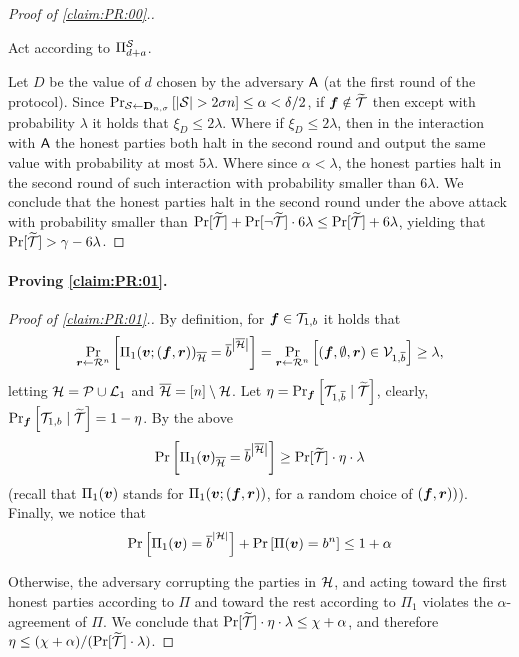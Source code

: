 \begin{proof}[Proof of \cref{claim:PR:00}.]
{\begin{algorithm}[$\Ac$]
\begin{description}
		\quad Act according to $\Pi^{{\cal{S}}}_{d+a}$.
			
	
\end{description}			
	\end{algorithm}
}

Let $D$ be the value of $d$ chosen by the adversary $\Ac$ (at the first round of the protocol).
Since $\Pr_{{\cal{S}} \gets \mathbf{D}_{n,\sigma}}\left[ \left|{\cal{S}}\right| > 2\sigma n\right] \le \alpha < \delta/2$,
if ${ \boldsymbol{f}} \notin {\widetilde{\mathcal{T}}}$ then except with probability $\lambda$ it holds that $\xi_D \le 2\lambda$. Where if $\xi_D \le 2\lambda$, then in the interaction with $\Ac$ the honest parties both halt in the second round and output the same value with probability at most $5\lambda$. Where since $\alpha < \lambda$, the honest parties halt in the second round of such interaction with probability smaller than $6\lambda$. We conclude that the honest parties halt in the second round under the above attack with probability smaller than $\Pr[{\widetilde{\mathcal{T}}}] + \Pr[\neg {\widetilde{\mathcal{T}}}]\cdot 6\lambda \le \Pr[{\widetilde{\mathcal{T}}}] + 6\lambda$, yielding that $\Pr[{\widetilde{\mathcal{T}}}] > \gamma- 6\lambda$.
\end{proof}




\paragraph{Proving \cref{claim:PR:01}.}


\newcommand{\oH}{{\overline{\cH}}}

\begin{proof}[Proof of \cref{claim:PR:01}.]
By definition, for ${ \boldsymbol{f}} \in \mathcal{T}_{1,b}$ it holds that
\begin{align*}
\ppr{\vr \gets \rn}{\Pi_1(\vv;(\vf,\vr))_\oH = \oo^{\size{\oH}} } = \ppr{\vr \gets \rn}{(\vf,\emptyset,\vr) \in \cV_{1,\oo} } \ge \lambda,
\end{align*}
letting ${\cal{H}} = \mathcal{P} \cup {\cal{L}}_1$ and $\oH = [n] \setminus\cH$. Let $\eta = \Pr_{{ \boldsymbol{f}}}\left[\mathcal{T}_{1,\overline{b}} \mid {\widetilde{\mathcal{T}}}\right]$, clearly,	$\Pr_{{ \boldsymbol{f}}}\left[\mathcal{T}_{1,b} \mid {\widetilde{\mathcal{T}}}\right] = 1 -\eta$. By the above
\begin{align}
 \pr{\Pi_1(\vv)_\oH = \oo^{\size{\oH}}} \ge \Pr[\tT]\cdot \eta \cdot \lambda
\end{align}
(recall that $\Pi_1({ \boldsymbol{v}})$ stands for $\Pi_1({ \boldsymbol{v}};({ \boldsymbol{f}},{ \boldsymbol{r}}))$, for a random choice of $({ \boldsymbol{f}},{ \boldsymbol{r}}))$).
Finally, we notice that
\begin{align}
\Pr_{}\left[\Pi_1({ \boldsymbol{v}}) = \overline{b}^{\left|{\cal{H}}\right|}\right] + \Pr_{}\left[\Pi({ \boldsymbol{v}}) = b^n\right] \le 1+ \alpha
\end{align}

Otherwise, the adversary corrupting the parties in ${\cal{H}}$, and acting toward the first honest parties according to $\Pi$ and toward the rest according to $\Pi_1$ violates the $\alpha$-agreement of $\Pi$. We conclude that $\Pr[{\widetilde{\mathcal{T}}}]\cdot \eta \cdot \lambda \le \chi + \alpha $, and therefore $\eta \le (\chi + \alpha)/(\Pr[{\widetilde{\mathcal{T}}}]\cdot \lambda)$.
\end{proof}



